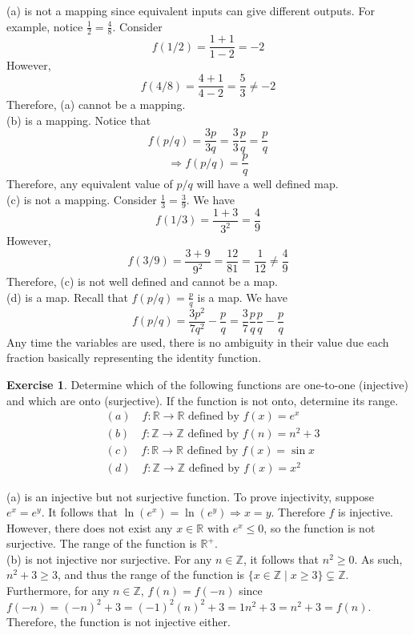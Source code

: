 \documentclass{article}
\theoremstyle{definition}
\newtheorem{environment}{Exercise}
\newenvironment{exercise}
    {\begin{mdframed}\begin{environment}}
    {\end{environment}\end{mdframed}}
\begin{document}
(a) is not a mapping since equivalent inputs can give different outputs. For example, notice \(\frac{1}{2}=\frac{4}{8}\). Consider
\[
    f(1/2)=\frac{1+1}{1-2}=-2
\]
However,
\[
    f(4/8)=\frac{4+1}{4-2}=\frac{5}{3}\neq -2
\]
Therefore, (a) cannot be a mapping.\\
(b) is a mapping. Notice that
\[
    f(p/q)=\frac{3p}{3q}=\frac{3}{3}\frac{p}{q}=\frac{p}{q}
\]
\[
    \Longrightarrow f(p/q)=\frac{p}{q}
\]
Therefore, any equivalent value of \(p/q\) will have a well defined map.\\
(c) is not a mapping. Consider \(\frac{1}{3}=\frac{3}{9}\). We have
\[
    f(1/3)=\frac{1+3}{3^2}=\frac{4}{9}
\]
However,
\[
    f(3/9)=\frac{3+9}{9^2}=\frac{12}{81}=\frac{1}{12}\neq \frac{4}{9}
\]
Therefore, (c) is not well defined and cannot be a map.\\
(d) is a map. Recall that \(f(p/q)=\frac{p}{q}\) is a map. We have
\[
    f(p/q)=\frac{3p^2}{7q^2}-\frac{p}{q}=\frac{3}{7}\frac{p}{q}\frac{p}{q}-\frac{p}{q}
\]
Any time the variables are used, there is no ambiguity in their value due each fraction basically representing the identity function.
\begin{exercise}
    Determine which of the following functions are one-to-one (injective) and which are onto (surjective). If the function is not onto, determine its range.
    \begin{align*}
        &(a)\quad f:\mathbb{R} \to \mathbb{R} \text{ defined by }f(x)=e^x\\
        &(b)\quad f:\mathbb{Z} \to \mathbb{Z} \text{ defined by }f(n)=n^2 + 3\\
        &(c)\quad f:\mathbb{R} \to \mathbb{R} \text{ defined by }f(x)=\sin x\\
        &(d)\quad f:\mathbb{Z} \to \mathbb{Z} \text{ defined by }f(x)=x^2    
    \end{align*}
\end{exercise}
(a) is an injective but not surjective function. To prove injectivity, suppose \(e^x = e^y\). It follows that \(\ln \left( e^x \right)=\ln \left( e^{y}  \right) \Longrightarrow x=y \). Therefore \(f\) is injective. However, there does not exist any \(x\in \mathbb{R} \) with \(e^x \leq 0\), so the function is not surjective. The range of the function is \(\mathbb{R} ^+\).\\
(b) is not injective nor surjective. For any \(n\in\mathbb{Z} \), it follows that \(n^2 \geq 0\). As such, \(n^2 + 3 \geq 3\), and thus the range of the function is \(\{ x\in\mathbb{Z} \mid x\geq 3 \} \subsetneq  \mathbb{Z} \). Furthermore, for any \(n\in\mathbb{Z} \), \(f(n)=f(-n)\) since \(f(-n)=(-n)^2 + 3 = (-1)^2(n)^2 + 3=1n^2 + 3=n^2 + 3=f(n)\). Therefore, the function is not injective either.\\
\end{document}
